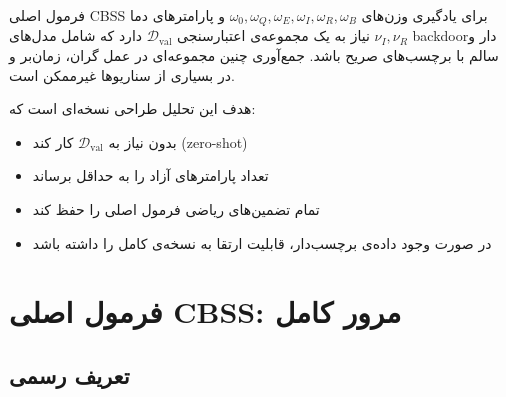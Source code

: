 \documentclass[12pt, a4paper]{article}
\newcommand{\en}[1]{\textenglish{#1}}
\newcommand{\param}[1]{\textcolor{accent}{\texttt{#1}}}
\begin{document}
فرمول اصلی \en{CBSS} برای یادگیری وزن‌های \param{$\omega_0, \omega_Q, \omega_E, \omega_I, \omega_R, \omega_B$} و پارامترهای دما \param{$\nu_I, \nu_R$} نیاز به یک مجموعه‌ی اعتبارسنجی \param{$\mathcal{D}_{\text{val}}$} دارد که شامل مدل‌های \en{backdoor}دار و سالم با برچسب‌های صریح باشد. جمع‌آوری چنین مجموعه‌ای در عمل گران، زمان‌بر و در بسیاری از سناریوها غیرممکن است.

هدف این تحلیل طراحی نسخه‌ای است که:
\begin{itemize}[leftmargin=*]
  \item بدون نیاز به \param{$\mathcal{D}_{\text{val}}$} کار کند (\en{zero-shot})
  \item تعداد پارامترهای آزاد را به حداقل برساند
  \item تمام تضمین‌های ریاضی فرمول اصلی را حفظ کند
  \item در صورت وجود داده‌ی برچسب‌دار، قابلیت ارتقا به نسخه‌ی کامل را داشته باشد
\end{itemize}

\section{فرمول اصلی \en{CBSS}: مرور کامل}

\subsection{تعریف رسمی}

\end{document}
